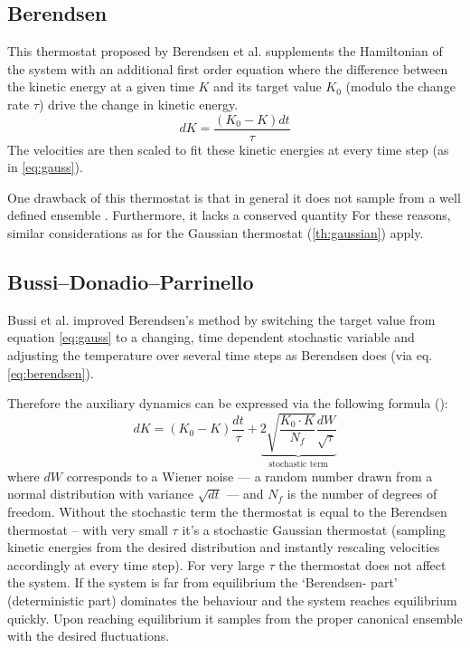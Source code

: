 \subsection{Berendsen}
This thermostat proposed by Berendsen et al. \cite{Berendsen1984} supplements the Hamiltonian of the system with an additional first order equation where the difference between the kinetic energy at a given time $K$ and its target value $K_0$ (modulo the change rate $\tau$) drive the change in kinetic energy.
\begin{equation}
{dK} = \frac{(K_0-K)dt}{\tau} \label{eq:berendsen}%
\end{equation}
The velocities are then scaled to fit these kinetic energies at every time step (as in \eqref{eq:gauss}).

One drawback of this thermostat is that in general it does not sample from a well defined ensemble \cite{Morishita2000}. Furthermore, it lacks a conserved quantity \cite{Bussi2007} For these reasons, similar considerations as for the Gaussian thermostat (\ref{th:gaussian}) apply.
\subsection{Bussi--Donadio--Parrinello}
Bussi et al.\cite{Bussi2007} improved Berendsen's method by switching the target value from equation \eqref{eq:gauss} to a changing, time dependent stochastic variable and adjusting the temperature over several time steps as Berendsen does (via eq. \eqref{eq:berendsen}). 

Therefore the auxiliary dynamics can be expressed via the following formula ():
\begin{equation}
dK = (K_0- K) \frac{dt}{\tau} + \underbrace{2\sqrt{\frac{K_0\cdot K}{N_f}}\frac{dW}{\sqrt{\tau}}}_{\text{stochastic term}}
\end{equation}
where $dW$ corresponds to a Wiener noise --- a random number drawn from a normal distribution with variance $\sqrt{dt}$ --- and $N_f$ is the number of degrees of freedom. 
Without the stochastic term the thermostat is equal to the Berendsen thermostat -- with very small $\tau$ it's a stochastic Gaussian thermostat (sampling kinetic energies from the desired distribution and instantly rescaling velocities accordingly at every time step). For very large $\tau$ the thermostat does not affect the system. If the system is far from equilibrium the `Berendsen- part' (deterministic part) dominates the behaviour and the system reaches equilibrium quickly. Upon reaching equilibrium it samples from the proper canonical ensemble with the desired fluctuations.

